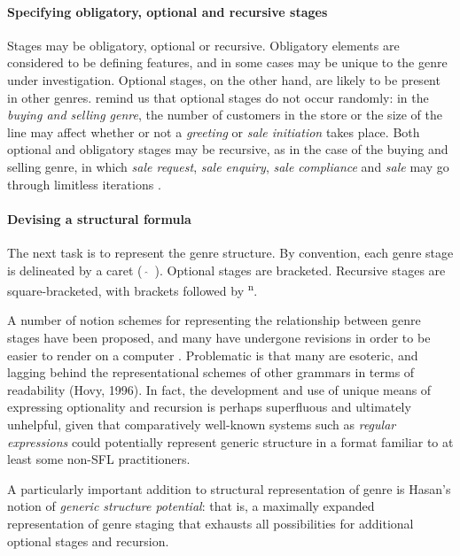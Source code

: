 \paragraph{Specifying obligatory, optional and recursive stages}

Stages may be obligatory, optional or recursive. Obligatory elements are considered to be defining features, and in some cases may be unique to the genre under investigation. Optional stages, on the other hand, are likely to be present in other genres. \textcite{halliday_language_1989} remind us that optional stages do not occur randomly: in the \emph{buying and selling genre}, the number of customers in the store or the size of the line may affect whether or not a \emph{greeting} or \emph{sale initiation} takes place. Both optional and obligatory stages may be recursive, as in the case of the buying and selling genre, in which \emph{sale request}, \emph{sale enquiry}, \emph{sale compliance} and \emph{sale} may go through limitless iterations \cite[p.~61]{halliday_language_1989}.

\paragraph{Devising a structural formula}

The next task is to represent the genre structure. By convention, each genre stage is delineated by a caret (~$\hat{}$~). Optional stages are bracketed. Recursive stages are square-bracketed, with brackets followed by  \textsuperscript{n}.

A number of notion schemes for representing the relationship between genre stages have been proposed, and many have undergone revisions in order to be easier to render on a computer \cite{eggins_introduction_2004}. Problematic is that many \cite[e.g. those in][]{halliday_language_1989} are esoteric, and lagging behind the representational schemes of other grammars in terms of readability (Hovy, 1996). In fact, the development and use of unique means of expressing optionality and recursion is perhaps superfluous and ultimately unhelpful, given that comparatively well\hyp{}known systems such as \emph{regular expressions} could potentially represent generic structure in a format familiar to at least some non\hyp{}\gls{SFL} practitioners. 

A particularly important addition to structural representation of genre is Hasan's \parencite*{hasan_structure_1985} notion of \emph{generic structure potential}: that is, a maximally expanded representation of genre staging that exhausts all possibilities for additional optional stages and recursion.

